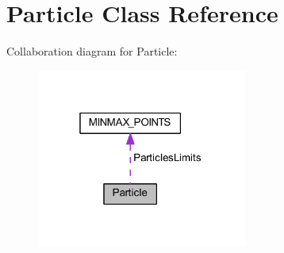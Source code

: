 \hypertarget{class_particle}{}\section{Particle Class Reference}
\label{class_particle}


Collaboration diagram for Particle\+:
\nopagebreak
\begin{figure}[H]
\begin{center}
\leavevmode
\includegraphics[width=196pt]{class_particle__coll__graph}
\end{center}
\end{figure}
